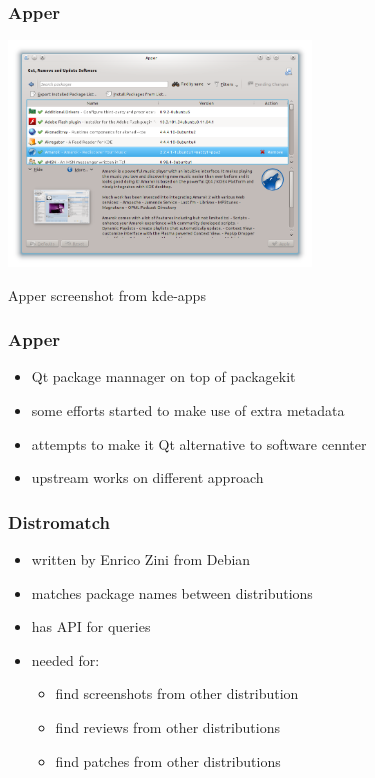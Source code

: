 \documentclass{beamer}
\begin{document}
\begin{frame}[t]
\frametitle{Apper}
\begin{center}
\includegraphics[height=6cm]{apper}

\small Apper screenshot from kde-apps
\end{center}
\end{frame}

\begin{frame}[t]
\frametitle{Apper}
\begin{itemize}
\item Qt package mannager on top of packagekit
\item some efforts started to make use of extra metadata
\item attempts to make it Qt alternative to software cennter
\item upstream works on different approach
\end{itemize}
\end{frame}

\begin{frame}[t]
\frametitle{Distromatch}
\begin{itemize}
\item written by Enrico Zini from Debian
\item matches package names between distributions
\item has API for queries
\item needed for:
\begin{itemize}
\item find screenshots from other distribution
\item find reviews from other distributions
\item find patches from other distributions
\end{itemize}
\end{itemize}
\end{frame}
\end{document}
